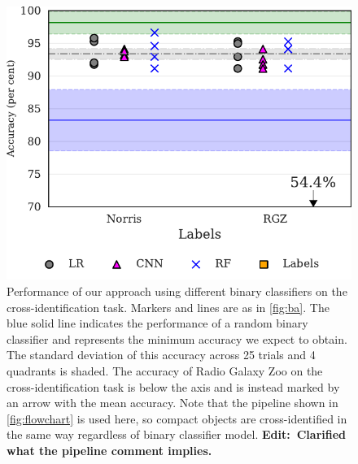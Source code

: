 \documentclass[fleqn,usenatbib,usedcolumn]{mnras}
\newcommand{\edit}[1]{{\bf Edit:~{#1}}}
\begin{document}
    \begin{figure}
      \centering
      \includegraphics[width=0.9\columnwidth]{images/cdfs_cross_identification_grid.pdf}
      \caption{Performance of our approach using different binary classifiers on the cross-identification task. Markers and lines are as in \autoref{fig:ba}. The blue solid line indicates the performance of a random binary classifier and represents the minimum accuracy we expect to obtain. The standard deviation of this accuracy across 25 trials and 4 quadrants is shaded. The accuracy of Radio Galaxy Zoo on the cross-identification task is below the axis and is instead marked by an arrow with the mean accuracy. Note that the pipeline shown in \autoref{fig:flowchart} is used here, so compact objects are cross-identified in the same way regardless of binary classifier model. \edit{Clarified what the pipeline comment implies.} \label{fig:cross-id-accuracy}}
    \end{figure}
\end{document}
